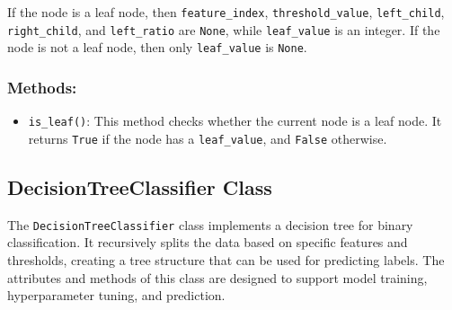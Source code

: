 \documentclass{article}
\begin{document}
\noindent If the node is a leaf node, then \texttt{feature\_index}, \texttt{threshold\_value}, \texttt{left\_child}, \texttt{right\_child}, and \texttt{left\_ratio} are \texttt{None}, while \texttt{leaf\_value} is an integer. If the node is not a leaf node, then only \texttt{leaf\_value} is \texttt{None}.

\subsubsection*{Methods:}
\begin{itemize}
    \item \texttt{is\_leaf()}: This method checks whether the current node is a leaf node. It returns \texttt{True} if the node has a \texttt{leaf\_value}, and \texttt{False} otherwise.
\end{itemize}

\subsection{DecisionTreeClassifier Class}

The \texttt{DecisionTreeClassifier} class implements a decision tree for binary classification. It recursively splits the data based on specific features and thresholds, creating a tree structure that can be used for predicting labels. The attributes and methods of this class are designed to support model training, hyperparameter tuning, and prediction.
\end{document}
